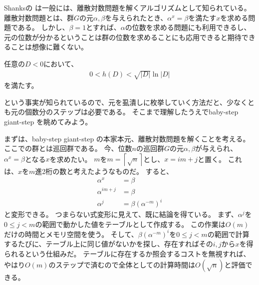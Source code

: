 Shanksの  は一般には、離散対数問題を解くアルゴリズムとして知られている。
離散対数問題とは、群$G$の元$\alpha,\beta$を与えられたとき、$\alpha^x=\beta$を満たす$x$を求める問題である。
しかし、$\beta=1$とすれば、$\alpha$の位数を求める問題にも利用できるし、元の位数が分かるということは群の位数を求めることにも応用できると期待できることは想像に難くない。

\begin{Prop}{}{}
任意の$D<0$において、
\begin{align*}
0 < h(D) < \sqrt{|D|}\ln{|D|}
\end{align*}
を満たす。
\end{Prop}

という事実が知られているので、元を虱潰しに枚挙していく方法だと、少なくとも元の個数分のステップは必要である。
そこまで理解したうえでbaby-step giant-step を眺めてみよう。

まずは、baby-step giant-step の本家本元、離散対数問題を解くことを考える。
ここでの群とは巡回群である。
今、位数$n$の巡回群$G$の元$\alpha,\beta$が与えられ、$\alpha^x=\beta$となる$x$を求めたい。
$m$を$m=\left\lceil \sqrt{n} \right\rceil$とし、$x=im+j$と置く。
これは、$x$を$m$進2桁の数と考えたようなものだ。
すると、
\begin{align*}
\alpha^x &= \beta\\
\alpha^{im+j} &= \beta\\
\alpha^j &= \beta(\alpha^{-m})^i
\end{align*}
と変形できる。
つまらない式変形に見えて、既に結論を得ている。
まず、$\alpha^j$を$0\le j<m$の範囲で動かした値をテーブルとして作成する。
この作業は$O(m)$だけの時間とメモリ空間を使う。
そして、$\beta(\alpha^{-m})^i$を$0\le j<m$の範囲で計算するたびに、テーブル上に同じ値がないかを探し、存在すればその$i,j$から$x$を得られるという仕組みだ。
テーブルに存在するか照会するコストを無視すれば、やはり$O(m)$のステップで済むので全体としての計算時間は$O(\sqrt{n})$と評価できる。
